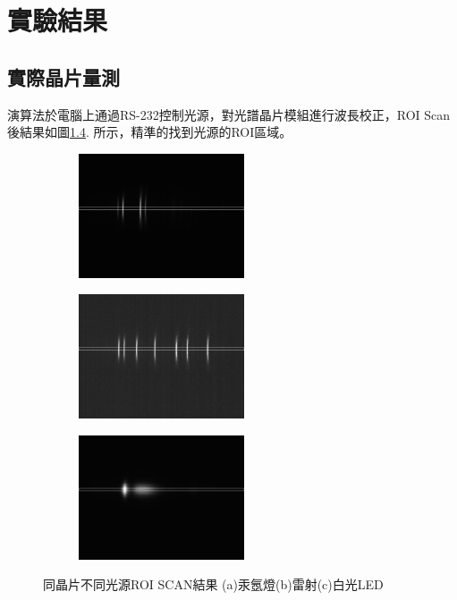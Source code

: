 \titlespacing{\chapter}{0cm}{-2cm}{0cm}
\chapter{實驗結果}


\section{實際晶片量測}
演算法於電腦上通過RS-232\cite{RS232}控制光源，對光譜晶片模組進行波長校正，ROI Scan後結果如圖\ref{fig:ROI SCAN 1}. 所示，精準的找到光源的ROI區域。

\begin{figure}[H]
	\vspace{0.8cm}
	\centering
	\begin{subfigure}[fig nice]{0.328\textwidth}
		\includegraphics[width=4.9cm]{figures/Result/20C4-205-C4_full_Image__Hg_Ar_2021-05-10-16-25.jpg}
		\caption{}
		\label{fig:image_HG1}
	\end{subfigure}
	\begin{subfigure}[fig nice]{0.328\textwidth}
		\includegraphics[width=4.9cm]{figures/Result/20C4-205-C4_full_Image__Laser8_2021-05-10-16-28.jpg}
		\caption{}
		\label{fig:image_LASER1}
	\end{subfigure}
	\begin{subfigure}[fig nice]{0.328\textwidth}
		\includegraphics[width=4.9cm]{figures/Result/20C4-205-C4_full_Image__White_2021-05-10-16-30.jpg}
		\caption{}
		\label{fig:image_White1}
	\end{subfigure}
	\caption[同一晶片下不同光源的ROI SCAN結果圖]{同晶片不同光源ROI SCAN結果 (a)汞氬燈(b)雷射(c)白光LED}
	\label{fig:ROI SCAN 1}
\end{figure} 
